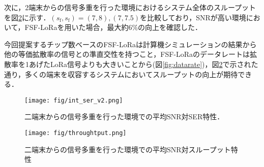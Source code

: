 \documentclass[technicalreport]{ieicej}
\begin{document}
次に，2端末からの信号多重を行った環境におけるシステム全体のスループットを図\ref{fig:through}に示す．$(s_\mathrm{f},s_\mathrm{f})=(7,8),(7,7.5)$を比較しており，SNRが高い環境において，FSF-LoRaを用いた場合，最大約$6\%$の向上を確認した．%


今回提案するチップ数ベースのFSF-LoRaは計算機シミュレーションの結果から他の等価拡散率の信号との準直交性を持つこと，FSF-LoRaのデータレートは拡散率を1あげたLoRa信号よりも大きいことから(図\ref{fig:datarate})，図\ref{fig:through}で示された通り，多くの端末を収容するシステムにおいてスループットの向上が期待できる．




\begin{figure}[t] 
\centering
\texttt{[image: fig/int\_ser\_v2.png]}
\caption{二端末からの信号多重を行った環境での平均SNR対SER特性．}
\label{fig:int_ser}
\end{figure}

\begin{figure}[t] 
\centering
\texttt{[image: fig/throughtput.png]}
\caption{二端末からの信号多重を行った環境での平均SNR対スループット特性}
\label{fig:through}
\end{figure}


\end{document}
